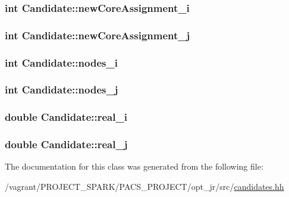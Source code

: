 \hypertarget{classCandidate_a859313416296683b7c0496d842dab48a}{
\subsubsection[{new\-Core\-Assignment\-\_\-i}]{\setlength{\rightskip}{0pt plus 5cm}int Candidate\-::new\-Core\-Assignment\-\_\-i}}\label{classCandidate_a859313416296683b7c0496d842dab48a}
\hypertarget{classCandidate_a1203966358bd849169b5f967de3c2bf7}{
\subsubsection[{new\-Core\-Assignment\-\_\-j}]{\setlength{\rightskip}{0pt plus 5cm}int Candidate\-::new\-Core\-Assignment\-\_\-j}}\label{classCandidate_a1203966358bd849169b5f967de3c2bf7}
\hypertarget{classCandidate_a7136b28b9f4ef84a661ba4132f59eaa3}{
\subsubsection[{nodes\-\_\-i}]{\setlength{\rightskip}{0pt plus 5cm}int Candidate\-::nodes\-\_\-i}}\label{classCandidate_a7136b28b9f4ef84a661ba4132f59eaa3}
\hypertarget{classCandidate_affe483f905741a62769d1fbebae48b4e}{
\subsubsection[{nodes\-\_\-j}]{\setlength{\rightskip}{0pt plus 5cm}int Candidate\-::nodes\-\_\-j}}\label{classCandidate_affe483f905741a62769d1fbebae48b4e}
\hypertarget{classCandidate_a93a050a3128d98f446176d9411535eea}{
\subsubsection[{real\-\_\-i}]{\setlength{\rightskip}{0pt plus 5cm}double Candidate\-::real\-\_\-i}}\label{classCandidate_a93a050a3128d98f446176d9411535eea}
\hypertarget{classCandidate_ad7e4bca76815c11f378f005baa93bffb}{
\subsubsection[{real\-\_\-j}]{\setlength{\rightskip}{0pt plus 5cm}double Candidate\-::real\-\_\-j}}\label{classCandidate_ad7e4bca76815c11f378f005baa93bffb}


The documentation for this class was generated from the following file\-:\begin{DoxyCompactItemize}
\item 
/vagrant/\-P\-R\-O\-J\-E\-C\-T\-\_\-\-S\-P\-A\-R\-K/\-P\-A\-C\-S\-\_\-\-P\-R\-O\-J\-E\-C\-T/opt\-\_\-jr/src/\hyperlink{candidates_8hh}{candidates.\-hh}\end{DoxyCompactItemize}
